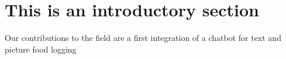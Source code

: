 \section{This is an introductory section}
Our contributions to the field are a first integration of a chatbot for text  and picture food logging

